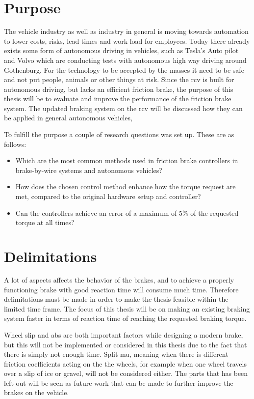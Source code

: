 \documentclass[a4paper,11pt]{kth-mag}
\begin{document}
\section{Purpose}
The vehicle industry as well as industry in general is moving towards automation to lower costs, risks, lead times and work load for employees. Today there already exists some form of autonomous driving in vehicles, such as Tesla's Auto pilot and Volvo which are conducting tests with autonomous high way driving around Gothenburg. For the technology to be accepted by the masses it need to be safe and not put people, animals or other things at risk. Since the \gls{rcv} is built for autonomous driving, but lacks an efficient friction brake, the purpose of this thesis will be to evaluate and improve the performance of the friction brake system. The updated braking system on the \gls{rcv} will be discussed how they can be applied in general autonomous vehicles, 

To fulfill the purpose a couple of research questions was set up. These are as follows: 
\begin{itemize}
\item Which are the most common methods used in friction brake controllers in brake-by-wire systems and autonomous vehicles? 
\item How does the chosen control method enhance how the torque request are met, compared to the original hardware setup and controller?
\item Can the controllers achieve an error of a maximum of 5\% of the requested torque at all times?
\end{itemize}

\section{Delimitations}
A lot of aspects affects the behavior of the brakes, and to achieve a properly functioning brake with good reaction time will consume much time. Therefore delimitations must be made in order to make the thesis feasible within the limited time frame. The focus of this thesis will be on making an existing braking system faster in terms of reaction time of reaching the requested braking torque. 

Wheel slip and \gls{abs} are both important factors while designing a modern brake, but this will not be implemented or considered in this thesis due to the fact that there is simply not enough time. Split mu, meaning when there is different friction coefficients acting on the the wheels, for example when one wheel travels over a slip of ice or gravel, will not be considered either. The parts that has been left out will be seen as future work that can be made to further improve the brakes on the vehicle. 
 
\end{document}
